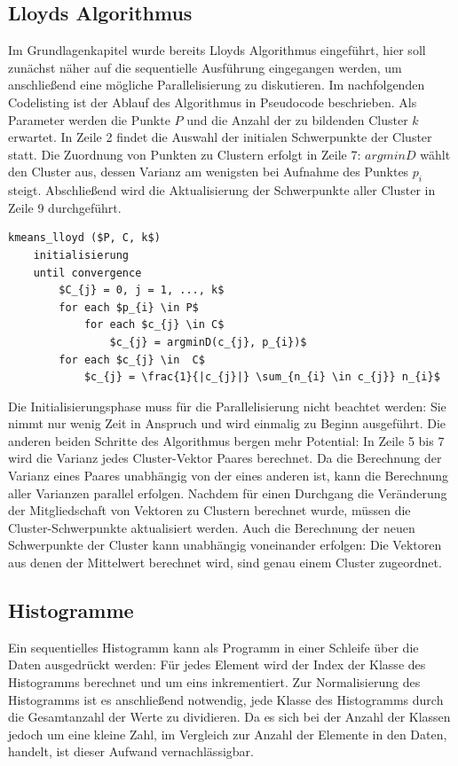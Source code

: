 \subsection{Lloyds Algorithmus}

Im Grundlagenkapitel wurde bereits Lloyds Algorithmus eingeführt, hier soll zunächst näher auf die sequentielle Ausführung eingegangen werden, um anschließend eine mögliche Parallelisierung zu diskutieren. Im nachfolgenden Codelisting ist der Ablauf des Algorithmus in Pseudocode beschrieben. Als Parameter werden die Punkte $P$ und die Anzahl der zu bildenden Cluster $k$ erwartet. In Zeile 2 findet die Auswahl der initialen Schwerpunkte der Cluster statt. Die Zuordnung von Punkten zu Clustern erfolgt in Zeile 7: $argminD$ wählt den Cluster aus, dessen Varianz am wenigsten bei Aufnahme des Punktes $p_{i}$ steigt. Abschließend wird die Aktualisierung der Schwerpunkte aller Cluster in Zeile 9 durchgeführt.

\lstset{language=C}
\begin{lstlisting}[mathescape=true]
kmeans_lloyd ($P, C, k$)
	initialisierung
	until convergence
		$C_{j} = 0, j = 1, ..., k$
		for each $p_{i} \in P$
			for each $c_{j} \in C$
				$c_{j} = argminD(c_{j}, p_{i})$		
		for each $c_{j} \in  C$
			$c_{j} = \frac{1}{|c_{j}|} \sum_{n_{i} \in c_{j}} n_{i}$
\end{lstlisting}

Die Initialisierungsphase muss für die Parallelisierung nicht beachtet werden: Sie nimmt nur wenig Zeit in Anspruch und wird einmalig zu Beginn ausgeführt. Die anderen beiden Schritte des Algorithmus bergen mehr Potential: In Zeile 5 bis 7 wird die Varianz jedes Cluster-Vektor Paares berechnet. Da die Berechnung der Varianz eines Paares unabhängig von der eines anderen ist, kann die Berechnung aller Varianzen parallel erfolgen. Nachdem für einen Durchgang die Veränderung der Mitgliedschaft von Vektoren zu Clustern berechnet wurde, müssen die Cluster-Schwerpunkte aktualisiert werden. Auch die Berechnung der neuen Schwerpunkte der Cluster kann unabhängig voneinander erfolgen: Die Vektoren aus denen der Mittelwert berechnet wird, sind genau einem Cluster zugeordnet.


\subsection{Histogramme}

Ein sequentielles Histogramm kann als Programm in einer Schleife über die Daten ausgedrückt werden: Für jedes Element wird der Index der Klasse des Histogramms berechnet und um eins inkrementiert. Zur Normalisierung des Histogramms ist es anschließend notwendig, jede Klasse des Histogramms durch die Gesamtanzahl der Werte zu dividieren. Da es sich bei der Anzahl der Klassen jedoch um eine kleine Zahl, im Vergleich zur Anzahl der Elemente in den Daten, handelt, ist dieser Aufwand vernachlässigbar.


